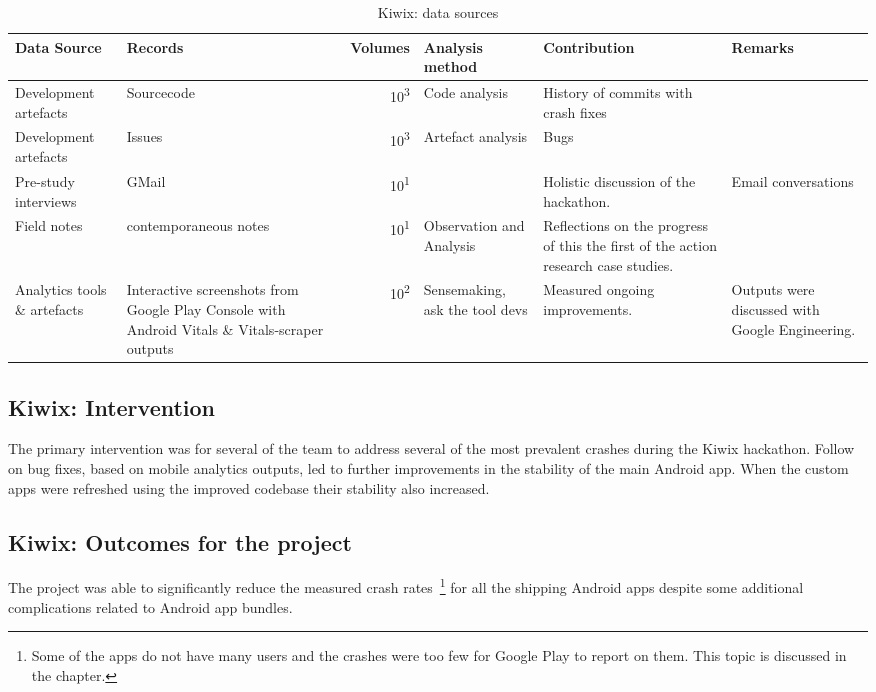 \begin{table*}
    \centering
    \footnotesize
    \tabcolsep=0.12cm
    \begin{tabular}{>{\raggedright}p{2cm} >{\raggedright}p{3.3cm} r >{\raggedright}p{2.1cm} >{\raggedright}p{2.2cm} >{\raggedright\arraybackslash}p{2.5cm}}
        Data Source & Records & Volumes & Analysis method & Contribution & Remarks \\
        \toprule
         Development artefacts & Sourcecode\footnotemark & 10\textsuperscript{3} & Code analysis & History of commits with crash fixes &  \\
         Development artefacts & Issues\footnotemark & 10\textsuperscript{3} & Artefact analysis & Bugs & \\
         Pre-study interviews & GMail & 10\textsuperscript{1} & & Holistic discussion of the hackathon. & Email conversations \\
         Field notes & contemporaneous notes & 10\textsuperscript{1} & Observation and Analysis & Reflections on the progress of this the first of the action research case studies. & \\
         Analytics tools \& artefacts &Interactive screenshots from Google Play Console with Android Vitals \& Vitals-scraper outputs &10\textsuperscript{2} & Sensemaking, ask the tool devs & Measured ongoing improvements. & Outputs were discussed with Google Engineering. \\
         \bottomrule
    \end{tabular}
    \caption{Kiwix: data sources}
    \label{tab:kiwix-data-sources}
\end{table*}



\subsection{Kiwix: Intervention}
The primary intervention was for several of the team to address several of the most prevalent crashes during the Kiwix hackathon. Follow on bug fixes, based on mobile analytics outputs, led to further improvements in the stability of the main Android app. When the custom apps were refreshed using the improved codebase their stability also increased.

\subsection{Kiwix: Outcomes for the project}
The project was able to significantly reduce the measured crash rates~\footnote{Some of the apps do not have many users and the crashes were too few for Google Play to report on them. This topic is discussed in the  chapter.} for all the shipping Android apps despite some additional complications related to Android app bundles. 

